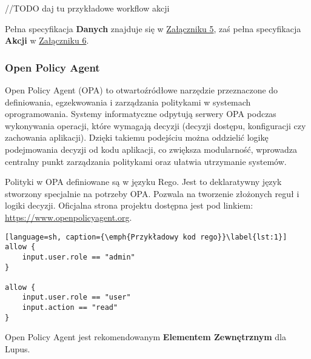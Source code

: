 //TODO daj tu przykładowe workflow akcji

Pełna specyfikacja \textbf{Danych} znajduje się w \hyperref[appendix:5]{Załączniku 5}, zaś pełna specyfikacja \textbf{Akcji} w \hyperref[appendix:6]{Załączniku 6}.

\subsubsection{Open Policy Agent}

Open Policy Agent (OPA) to otwartoźródłowe narzędzie przeznaczone do definiowania, egzekwowania i zarządzania politykami w systemach oprogramowania. Systemy informatyczne odpytują serwery OPA podczas wykonywania operacji, które wymagają decyzji (decyzji dostępu, konfiguracji czy zachowania aplikacji). Dzięki takiemu podejściu można oddzielić logikę podejmowania decyzji od kodu aplikacji, co zwiększa modularność, wprowadza centralny punkt zarządzania politykami oraz ułatwia utrzymanie systemów.

Polityki w OPA definiowane są w języku Rego. Jest to deklaratywny język stworzony specjalnie na potrzeby OPA. Pozwala na tworzenie złożonych reguł i logiki decyzji. Oficjalna strona projektu dostępna jest pod linkiem: \url{https://www.openpolicyagent.org}.

\begin{lstlisting}[language=sh, caption={\emph{Przykładowy kod rego}}\label{lst:1}]
allow {
    input.user.role == "admin"
}

allow {
    input.user.role == "user"
    input.action == "read"
}
\end{lstlisting}

Open Policy Agent jest rekomendowanym \textbf{Elementem Zewnętrznym} dla Lupus.